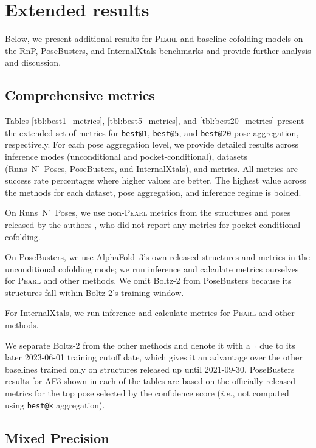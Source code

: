 \documentclass[11pt, letterpaper, onecolumn]{tau-class/tau}
\makeatletter
\newcommand{\pearl}{\textsc{Pearl}\xspace}
\newcommand{\alphafold}[1]{AlphaFold~#1\xspace}
\newcommand{\af}[1]{AF#1\xspace}
\newcommand{\boltz}[1]{\mbox{Boltz-#1\xspace}}
\newcommand{\best}[1]{\texttt{best@#1}\xspace}
\newcommand{\bestk}{\best{k}}
\newcommand{\runsnposes}{Runs~N'~Poses\xspace}
\newcommand{\rnp}{RnP\xspace}
\newcommand{\posebusters}{PoseBusters\xspace}
\newcommand{\internalxtals}{InternalXtals\xspace}
\newcommand{\ie}{\textit{i.e.}\xspace}
\newcommand{\fmtdate}[1]{\mbox{#1\xspace}}
\makeatother
\begin{document}
\section{Extended results}
\label{app:results}

Below, we present additional results for \pearl and baseline cofolding models on the \rnp, \posebusters, and \internalxtals benchmarks and provide further analysis and discussion.


\subsection{Comprehensive metrics}
\label{app:metrics}



Tables \ref{tbl:best1_metrics}, \ref{tbl:best5_metrics}, and \ref{tbl:best20_metrics} present the extended set of metrics for \best{1}, \best{5}, and \best{20} pose aggregation, respectively.
For each pose aggregation level, we provide detailed results across inference modes (unconditional and pocket-conditional), datasets (\runsnposes, \posebusters, and \internalxtals), and metrics.
All metrics are success rate percentages where higher values are better.
The highest value across the methods for each dataset, pose aggregation, and inference regime is bolded.

On \runsnposes, we use non-\pearl metrics from the structures and poses released by the authors \cite{vskrinjar2025have}, who did not report any metrics for pocket-conditional cofolding.

On \posebusters, we use \alphafold{3}'s own released structures and metrics in the unconditional cofolding mode; we run inference and calculate metrics ourselves for \pearl and other methods.
We omit \boltz{2} from \posebusters because its structures fall within \boltz{2}'s training window. 

For \internalxtals, we run inference and calculate metrics for \pearl and other methods.

We separate \boltz{2} from the other methods and denote it with a $\dag$ due to its later \fmtdate{2023-06-01} training cutoff date, which gives it an advantage over the other baselines trained only on structures released up until \fmtdate{2021-09-30}.
\posebusters results for \af3 shown in each of the tables are based on the officially released metrics for the top pose selected by the confidence score (\ie, not computed using \bestk aggregation).


\subsection{Mixed Precision}
\label{app:mixed-precision}
\end{document}
